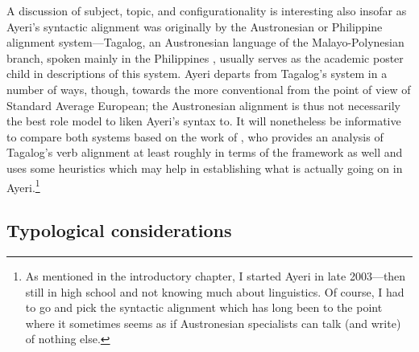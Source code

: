 A discussion of subject, topic, and configurationality is interesting also
insofar as Ayeri's syntactic alignment was originally  by the
Austronesian or Philippine alignment system---Tagalog, an Austronesian language
of the Malayo-Polynesian branch, spoken mainly in the Philippines
\parencites{glottolog:tgl}{schachterotanes1972}, usually serves as the
academic poster child in descriptions of this system. Ayeri departs from
Tagalog's system in a number of ways, though, towards the more conventional
from the point of view of Standard Average European; the Austronesian alignment
is thus not necessarily the best role model to liken Ayeri's syntax to. It will
nonetheless be informative to compare both systems based on the work of
\textcites{kroeger1991}{kroeger1993}, who provides an analysis of Tagalog's
verb alignment at least roughly in terms of the \Lfg{} framework as well and
uses some heuristics which may help in establishing what is actually going on
in Ayeri.\footnote{As mentioned in the introductory chapter, I started Ayeri in
late 2003---then still in high school and not knowing much about linguistics.
Of course, I had to go and pick the syntactic alignment which has long been
 to the point where it  {sometimes
seems as if Austronesian specialists can talk (and write) of nothing else}.}

\subsection{Typological considerations}
\label{sec:verbtypo}

